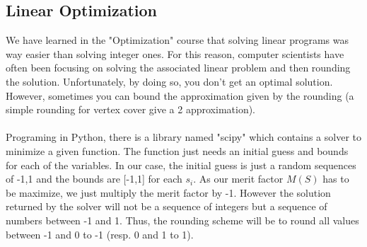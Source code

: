 \documentclass[a4paper,11pt,openany]{article}
\begin{document}
\subsection{Linear Optimization}
\label{linear_optim}
\noindent
We have learned in the "Optimization" course that solving linear programs was way easier than solving integer ones. For this reason, computer scientists have often been focusing on solving the associated linear problem and then rounding the solution. Unfortunately, by doing so, you don't get an optimal solution. However, sometimes you can bound the approximation given by the rounding (a simple rounding for vertex cover give a 2 approximation).\\\\
Programing in Python, there is a library named "scipy" which contains a solver to minimize a given function. The function just needs an initial guess and bounds for each of the variables. In our case, the initial guess is just a random sequences of {-1,1} and the bounds are [-1,1] for each $s_i$. As our merit factor $M(S)$ has to be maximize, we just multiply the merit factor by -1. However the solution returned by the solver will not be a sequence of integers but a sequence of numbers between -1 and 1. Thus, the rounding scheme will be to round all values between -1 and 0 to -1 (resp. 0 and 1 to 1). \\\\
\end{document}
